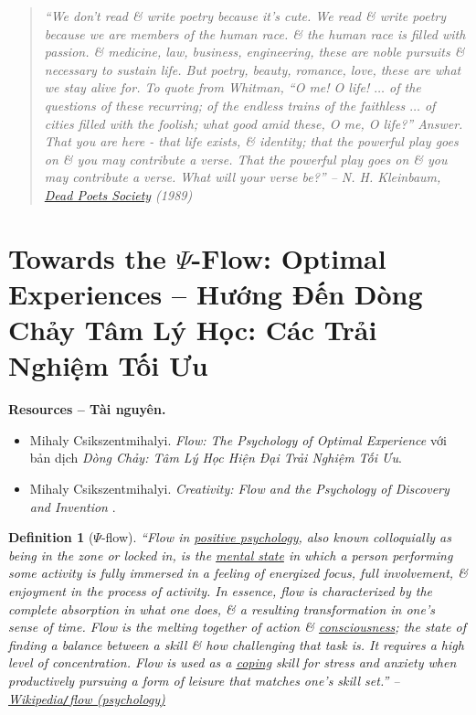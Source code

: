 \documentclass[12pt]{article}
\newtheorem{definition}{Definition}[section]
\begin{document}
\begin{quote}\it
	``We don't read \& write poetry because it's cute. We read \& write poetry because we are members of the human race. \& the human race is filled with passion. \& medicine, law, business, engineering, these are noble pursuits \& necessary to sustain life. But poetry, beauty, romance, love, these are what we stay alive for. To quote from Whitman, ``O me! O life! $\ldots$ of the questions of these recurring; of the endless trains of the faithless $\ldots$ of cities filled with the foolish; what good amid these, O me, O life?'' Answer. That you are here - that life exists, \& identity; that the powerful play goes on \& you may contribute a verse. That the powerful play \emph{goes on} \& you may contribute a verse. What will your verse be?'' --  {\sc N. H. Kleinbaum}, \href{https://www.imdb.com/title/tt0097165}{\it Dead Poets Society} (1989)
\end{quote}


\section{Towards the $\Psi$-Flow: Optimal Experiences -- Hướng Đến Dòng Chảy Tâm Lý Học: Các Trải Nghiệm Tối Ưu}
\noindent\textbf{\textsf{Resources -- Tài nguyên.}}
\begin{itemize}
	\item {\sc Mihaly Csikszentmihalyi}. {\it Flow: The Psychology of Optimal Experience} \cite{Csikszentmihalyi2008} với bản dịch {\it Dòng Chảy: Tâm Lý Học Hiện Đại Trải Nghiệm Tối Ưu}.
	\item {\sc Mihaly Csikszentmihalyi}. {\it Creativity: Flow and the Psychology of Discovery and Invention} \cite{Csikszentmihalyi2013}.
\end{itemize}

\begin{definition}[$\Psi$-flow]
	``\emph{Flow} in \href{https://en.wikipedia.org/wiki/Positive_psychology}{positive psychology}, also known colloquially as being \emph{in the zone} or \emph{locked in}, is the \href{https://en.wikipedia.org/wiki/Mental_state}{mental state} in which a person performing some activity is fully immersed in a feeling of energized focus, full involvement, \& enjoyment in the process of activity. In essence, flow is characterized by the complete absorption in what one does, \& a resulting transformation in one's sense of time. Flow is the melting together of action \& \href{https://en.wikipedia.org/wiki/Consciousness}{consciousness}; the state of finding a balance between a skill \& how challenging that task is. It requires a high level of concentration. Flow is used as a \href{https://en.wikipedia.org/wiki/Coping}{coping} skill for stress and anxiety when productively pursuing a form of leisure  that matches one's skill set.'' -- \href{https://en.wikipedia.org/wiki/Flow_(psychology)}{Wikipedia{\tt/}flow (psychology)}
\end{definition}
\end{document}
